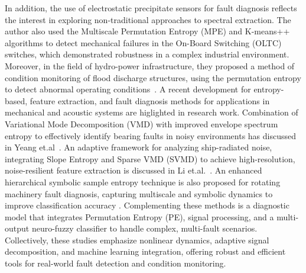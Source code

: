 In addition, the use of electrostatic precipitate sensors for fault diagnosis reflects the interest in exploring non-traditional approaches to spectral extraction. The author also used the Multiscale Permutation Entropy (MPE) and K-means++ algorithms to detect mechanical failures in the On-Board Switching (OLTC) switches, which demonstrated robustness in a complex industrial environment. 
Moreover, in the field of hydro-power infrastructure, they proposed a method of condition monitoring of flood discharge structures, using the permutation entropy to detect abnormal operating conditions~\cite{Zhang2015, Zhang2015b, Zhang2015c, Zhang2018a, Zhang2018h}. A recent development for entropy-based, feature extraction, and fault diagnosis methods for applications in mechanical and acoustic systems are higlighted in research work. Combination of Variational Mode Decomposition (VMD) with improved envelope spectrum entropy to effectively identify bearing faults in noisy environments has discussed in Yeang et.al~\cite{Yang2023b}. An adaptive framework for analyzing ship-radiated noise, integrating Slope Entropy and Sparse VMD (SVMD) to achieve high-resolution, noise-resilient feature extraction is discussed in Li et.al.~\cite{Li2023h}. An enhanced hierarchical symbolic sample entropy technique is also proposed for rotating machinery fault diagnosis, capturing multiscale and symbolic dynamics to improve classification accuracy \cite{Wang2023h}. Complementing these methods is a diagnostic model that integrates Permutation Entropy (PE), signal processing, and a multi-output neuro-fuzzy classifier to handle complex, multi-fault scenarios. Collectively, these studies emphasize nonlinear dynamics, adaptive signal decomposition, and machine learning integration, offering robust and efficient tools for real-world fault detection and condition monitoring.~\cite{Rajabi2022} 

